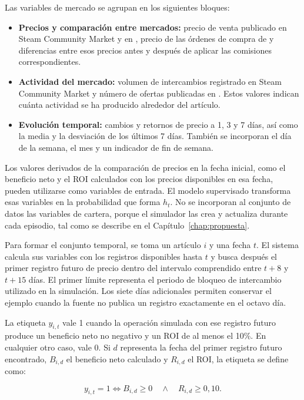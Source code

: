 Las variables de mercado se agrupan en los siguientes bloques:

\begin{itemize}
  \item \textbf{Precios y comparación entre mercados:} precio de venta publicado en Steam Community Market y en , precio de las órdenes de compra de  y diferencias entre esos precios antes y después de aplicar las comisiones correspondientes.
  \item \textbf{Actividad del mercado:} volumen de intercambios registrado en Steam Community Market y número de ofertas publicadas en . Estos valores indican cuánta actividad se ha producido alrededor del artículo.
  \item \textbf{Evolución temporal:} cambios y retornos de precio a 1, 3 y 7 días, así como la media y la desviación de los últimos 7 días. También se incorporan el día de la semana, el mes y un indicador de fin de semana.
\end{itemize}

Los valores derivados de la comparación de precios en la fecha inicial, como el beneficio neto y el ROI calculados con los precios disponibles en esa fecha, pueden utilizarse como variables de entrada. El modelo supervisado transforma esas variables en la probabilidad que forma $h_t$. No se incorporan al conjunto de datos las variables de cartera, porque el simulador las crea y actualiza durante cada episodio, tal como se describe en el Capítulo~\ref{chap:propuesta}.

Para formar el conjunto temporal, se toma un artículo $i$ y una fecha $t$. El sistema calcula sus variables con los registros disponibles hasta $t$ y busca después el primer registro futuro de precio dentro del intervalo comprendido entre $t+8$ y $t+15$ días. El primer límite representa el periodo de bloqueo de intercambio utilizado en la simulación. Los siete días adicionales permiten conservar el ejemplo cuando la fuente no publica un registro exactamente en el octavo día.

La etiqueta $y_{i,t}$ vale 1 cuando la operación simulada con ese registro futuro produce un beneficio neto no negativo y un ROI de al menos el 10\%. En cualquier otro caso, vale 0. Si $d$ representa la fecha del primer registro futuro encontrado, $B_{i,d}$ el beneficio neto calculado y $R_{i,d}$ el ROI, la etiqueta se define como:

\[
y_{i,t} = 1
\Longleftrightarrow
B_{i,d} \geq 0
\quad \land \quad
R_{i,d} \geq 0{,}10.
\]

